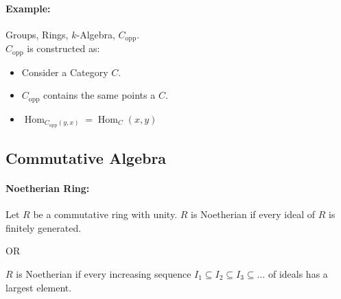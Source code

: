 \documentclass[12pt, oneside]{book}
\DeclareMathOperator{\Hom}{\mathrm{Hom}}
\begin{document}
\paragraph{Example:} Groups, Rings, \(k\)-Algebra, \(C_{\mathrm{opp}}\).\\
\(C_{\mathrm{opp}}\) is constructed as:
\begin{itemize}
    \item Consider a Category \(C\).
    \item \(C_{\mathrm{opp}}\) contains the same points a \(C\).
    \item \(\Hom_{C_{\mathrm{opp}}(y,x)} = \Hom_C(x,y)\)
\end{itemize}

\subsection{Commutative Algebra}

\paragraph{Noetherian Ring:} Let \(R\) be a commutative ring with unity.
\(R\) is Noetherian if every ideal of \(R\) is finitely generated.
\begin{center}
    OR
\end{center}
\(R\) is Noetherian if every increasing sequence \(I_1 \subseteq I_2 \subseteq I_3 \subseteq \dots \) of ideals has a largest element.
\end{document}
